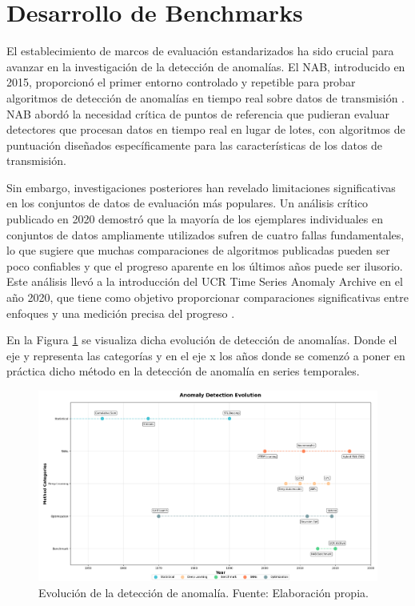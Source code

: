 \section{Desarrollo de Benchmarks}

El establecimiento de marcos de evaluación estandarizados ha sido crucial para avanzar en la investigación de la detección de anomalías. El NAB, introducido en 2015, proporcionó el primer entorno controlado y repetible para probar algoritmos de detección de anomalías en tiempo real sobre datos de transmisión \cite{lavin_evaluating_2015}. NAB abordó la necesidad crítica de puntos de referencia que pudieran evaluar detectores que procesan datos en tiempo real en lugar de lotes, con algoritmos de puntuación diseñados específicamente para las características de los datos de transmisión.

Sin embargo, investigaciones posteriores han revelado limitaciones significativas en los conjuntos de datos de evaluación más populares. Un análisis crítico publicado en 2020 demostró que la mayoría de los ejemplares individuales en conjuntos de datos ampliamente utilizados sufren de cuatro fallas fundamentales, lo que sugiere que muchas comparaciones de algoritmos publicadas pueden ser poco confiables y que el progreso aparente en los últimos años puede ser ilusorio. Este análisis llevó a la introducción del UCR Time Series Anomaly Archive en el año 2020, que tiene como objetivo proporcionar comparaciones significativas entre enfoques y una medición precisa del progreso \cite{wu_current_2023}.

En la Figura \ref{fig:Evolución de la detección de anomalía} se visualiza dicha evolución de detección de anomalías. Donde el eje y representa las categorías y en el eje x los años donde se comenzó a poner en práctica dicho método en la detección de anomalía en series temporales.


\begin{figure}
    \centering
    \includegraphics[width=\paperwidth,height=\paperheight,keepaspectratio,angle=90]{Imagenes/Anomaly Detection Evolution.png}
    \caption{Evolución de la detección de anomalía. Fuente: Elaboración propia.}
    \label{fig:Evolución de la detección de anomalía}
\end{figure}
